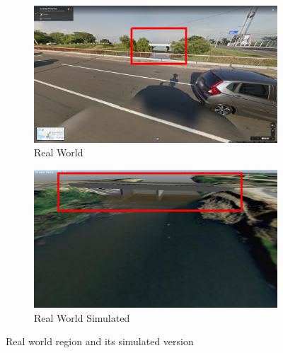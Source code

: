     \begin{figure}[H]
    \centering
        \begin{subfigure}[b]{0.5\textwidth}
            \centering
            \includegraphics[scale=0.1]{figs/simulation_diluvio_googleLocation2_1_roundedArea.png}
            \caption{Real World}
            \label{fig:simulation_diluvio_googleLocation2_1_roundedArea}
        \end{subfigure}
        \begin{subfigure}[b]{0.4\textwidth}
            \centering
            \includegraphics[scale=0.1]{figs/simulation_diluvio_googleLocation2_2_roundedArea.png}
            \caption{Real World Simulated}
            \label{fig:simulation_diluvio_googleLocation2_2_roundedArea}
        \end{subfigure}
    
    \caption{Real world region and its simulated version}
    \label{fig:simulation_diluvio_googleLocation2_roundedArea}
    \end{figure}
    
    
